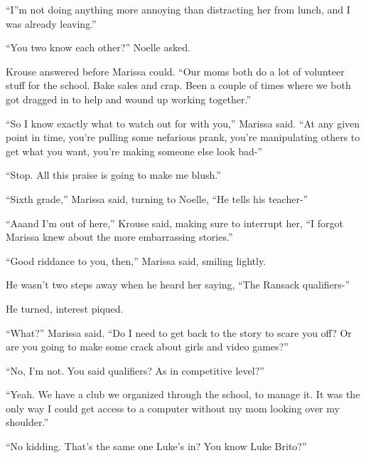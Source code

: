 ``I''m not doing anything more annoying than distracting her from lunch, and I was already leaving.''



``You two know each other?'' Noelle asked.



Krouse answered before Marissa could.  ``Our moms both do a lot of volunteer stuff for the school.  Bake sales and crap.  Been a couple of times where we both got dragged in to help and wound up working together.''



``So I know exactly what to watch out for with you,'' Marissa said.  ``At any given point in time, you're pulling some nefarious prank, you're manipulating others to get what you want, you're making someone else look bad-''



``Stop.  All this praise is going to make me blush.''



``Sixth grade,'' Marissa said, turning to Noelle, ``He tells his teacher-''



``Aaand I'm out of here,'' Krouse said, making sure to interrupt her, ``I forgot Marissa knew about the more embarrassing stories.''



``Good riddance to you, then,'' Marissa said, smiling lightly.



He wasn't two steps away when he heard her saying, ``The Ransack qualifiers-''



He turned, interest piqued.



``What?'' Marissa said.  ``Do I need to get back to the story to scare you off?  Or are you going to make some crack about girls and video games?''



``No, I'm not.  You said qualifiers?  As in competitive level?''



``Yeah.  We have a club we organized through the school, to manage it.  It was the only way I could get access to a computer without my mom looking over my shoulder.''



``No kidding.  That's the same one Luke's in?  You know Luke Brito?''



